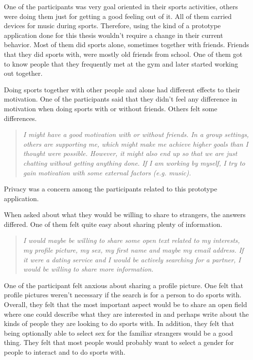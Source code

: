 One of the participants was very goal oriented in their sports activities, others were doing them just for getting a good feeling out of it. All of them carried devices for music during sports. Therefore, using the kind of a prototype application done for this thesis wouldn't require a change in their current behavior. Most of them did sports alone, sometimes together with friends. Friends that they did sports with, were mostly old friends from school. One of them got to know people that they frequently met at the gym and later started working out together.

Doing sports together with other people and alone had different effects to their motivation. One of the participants said that they didn't feel any difference in motivation when doing sports with or without friends. Others felt some differences.

\begin{quotation}
\it I might have a good motivation with or without friends. In a group settings, others are supporting me, which might make me achieve higher goals than I thought were possible. However, it might also end up so that we are just chatting without getting anything done. If I am working by myself, I try to gain motivation with some external factors (e.g. music).
\end{quotation}

Privacy was a concern among the participants related to this prototype application.

When asked about what they would be willing to share to strangers, the answers differed. One of them felt quite easy about sharing plenty of information.

\begin{quotation}
\it I would maybe be willing to share some open text related to my interests, my profile picture, my sex, my first name and maybe my email address. If it were a dating service and I would be actively searching for a partner, I would be willing to share more information.
\end{quotation}

One of the participant felt anxious about sharing a profile picture. One felt that profile pictures weren't necessary if the search is for a person to do sports with. Overall, they felt that the most important aspect would be to share an open field where one could describe what they are interested in and perhaps write about the kinds of people they are looking to do sports with. In addition, they felt that being optionally able to select sex for the familiar strangers would be a good thing. They felt that most people would probably want to select a gender for people to interact and to do sports with.

